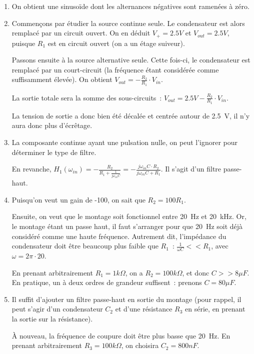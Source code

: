 \documentclass{../template/tp}
\begin{document}
{
	\begin{enumerate}
		\item On obtient une sinusoïde dont les alternances négatives sont ramenées à zéro.

		\item Commençons par étudier la source continue seule.
		Le condensateur est alors remplacé par un circuit ouvert.
		On en déduit $V_+ = 2.5V$ et $V_{out} = 2.5 V$, puisque $R_1$ est en circuit ouvert (on a un étage suiveur).

		Passons ensuite à la source alternative seule.
		Cette fois-ci, le condensateur est remplacé par un court-circuit (la fréquence étant considérée comme suffisamment élevée).
		On obtient $V_{out} = -\frac{R_2}{R_1}\cdot V_{in}$.

		La sortie totale sera la somme des sous-circuits~: $V_{out} = 2.5 V - \frac{R_2}{R_1}\cdot V_{in}$.

		La tension de sortie a donc bien été décalée et centrée autour de 2.5~V, il n'y aura donc plus d'écrêtage.

		\item La composante continue ayant une pulsation nulle, on peut l'ignorer pour déterminer le type de filtre.

		En revanche, $H_1(\omega_{in}) = - \frac{R_2}{R_1 + \frac{1}{j\omega_{in}C}} = - \frac{j\omega_{in}C \cdot R_2}{j\omega_{in}C + R_1}$. Il s'agit d'un filtre passe-haut.

		\item Puisqu'on veut un gain de -100, on sait que $R_2 = 100 R_1$.

		Ensuite, on veut que le montage soit fonctionnel entre 20~Hz et 20~kHz. Or, le montage étant un passe haut, il faut s'arranger pour que 20~Hz soit déjà considéré comme une haute fréquence.
		Autrement dit, l'impédance du condensateur doit être beaucoup plus faible que $R_1$~: $\frac{1}{\omega C} << R_1$, avec $\omega = 2 \pi \cdot 20$.

		En prenant arbitrairement $R_1 = 1k\Omega$, on a $R_2 = 100k\Omega$, et donc $C >> 8 \mu F$.
		En pratique, un à deux ordres de grandeur suffisent~: prenons $C = 80 \mu F$.

		\item Il suffit d'ajouter un filtre passe-haut en sortie du montage (pour rappel, il peut s'agir d'un condensateur $C_2$ et d'une résistance $R_3$ en série, en prenant la sortie sur la résistance).

		À nouveau, la fréquence de coupure doit être plus basse que 20~Hz.
		En prenant arbitrairement $R_3 = 100 k\Omega$, on choisira $C_2 = 800 nF$.
	\end{enumerate}
}
\end{document}
